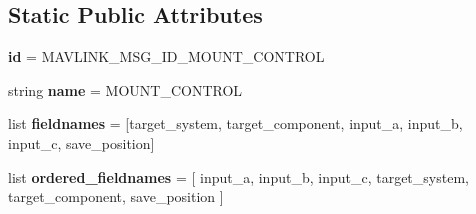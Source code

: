 \subsection*{Static Public Attributes}
\begin{DoxyCompactItemize}
\item 
\mbox{\label{classpymavlink_1_1dialects_1_1v10_1_1MAVLink__mount__control__message_a52f5b0dbf1cf712ad568817f8d59c4e8}} 
{\bfseries id} = M\+A\+V\+L\+I\+N\+K\+\_\+\+M\+S\+G\+\_\+\+I\+D\+\_\+\+M\+O\+U\+N\+T\+\_\+\+C\+O\+N\+T\+R\+OL
\item 
\mbox{\label{classpymavlink_1_1dialects_1_1v10_1_1MAVLink__mount__control__message_a441efb16da6c233ec90cd61a1e607cb5}} 
string {\bfseries name} = \textquotesingle{}M\+O\+U\+N\+T\+\_\+\+C\+O\+N\+T\+R\+OL\textquotesingle{}
\item 
\mbox{\label{classpymavlink_1_1dialects_1_1v10_1_1MAVLink__mount__control__message_a5e77a29123f35ccaa609295a0da387fb}} 
list {\bfseries fieldnames} = \mbox{[}\textquotesingle{}target\+\_\+system\textquotesingle{}, \textquotesingle{}target\+\_\+component\textquotesingle{}, \textquotesingle{}input\+\_\+a\textquotesingle{}, \textquotesingle{}input\+\_\+b\textquotesingle{}, \textquotesingle{}input\+\_\+c\textquotesingle{}, \textquotesingle{}save\+\_\+position\textquotesingle{}\mbox{]}
\item 
\mbox{\label{classpymavlink_1_1dialects_1_1v10_1_1MAVLink__mount__control__message_a53caef5e5aa63ae2ede5b3b5f3b2eafd}} 
list {\bfseries ordered\+\_\+fieldnames} = \mbox{[} \textquotesingle{}input\+\_\+a\textquotesingle{}, \textquotesingle{}input\+\_\+b\textquotesingle{}, \textquotesingle{}input\+\_\+c\textquotesingle{}, \textquotesingle{}target\+\_\+system\textquotesingle{}, \textquotesingle{}target\+\_\+component\textquotesingle{}, \textquotesingle{}save\+\_\+position\textquotesingle{} \mbox{]}
\item 
\mbox{\label{classpymavlink_1_1dialects_1_1v10_1_1MAVLink__mount__control__message_a3ea96d9fd667357f141f6e3bd9f49a94}} 

\end{DoxyCompactItemize}
